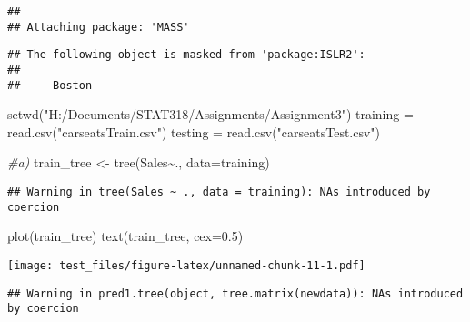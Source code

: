 \documentclass[
]{article}
\newenvironment{Shaded}{\begin{snugshade}}{\end{snugshade}}
\newcommand{\AttributeTok}[1]{\textcolor[rgb]{0.77,0.63,0.00}{#1}}
\newcommand{\CommentTok}[1]{\textcolor[rgb]{0.56,0.35,0.01}{\textit{#1}}}
\newcommand{\DecValTok}[1]{\textcolor[rgb]{0.00,0.00,0.81}{#1}}
\newcommand{\FloatTok}[1]{\textcolor[rgb]{0.00,0.00,0.81}{#1}}
\newcommand{\FunctionTok}[1]{\textcolor[rgb]{0.00,0.00,0.00}{#1}}
\newcommand{\NormalTok}[1]{#1}
\newcommand{\OtherTok}[1]{\textcolor[rgb]{0.56,0.35,0.01}{#1}}
\newcommand{\SpecialCharTok}[1]{\textcolor[rgb]{0.00,0.00,0.00}{#1}}
\newcommand{\StringTok}[1]{\textcolor[rgb]{0.31,0.60,0.02}{#1}}
\begin{document}
\begin{verbatim}
## 
## Attaching package: 'MASS'
\end{verbatim}

\begin{verbatim}
## The following object is masked from 'package:ISLR2':
## 
##     Boston
\end{verbatim}

\begin{Shaded}
\begin{Highlighting}[]
\FunctionTok{setwd}\NormalTok{(}\StringTok{"H:/Documents/STAT318/Assignments/Assignment3"}\NormalTok{)}
\NormalTok{training }\OtherTok{=} \FunctionTok{read.csv}\NormalTok{(}\StringTok{"carseatsTrain.csv"}\NormalTok{)}
\NormalTok{testing }\OtherTok{=} \FunctionTok{read.csv}\NormalTok{(}\StringTok{"carseatsTest.csv"}\NormalTok{)}

\CommentTok{\#a)}
\NormalTok{train\_tree }\OtherTok{\textless{}{-}} \FunctionTok{tree}\NormalTok{(Sales}\SpecialCharTok{\textasciitilde{}}\NormalTok{., }\AttributeTok{data=}\NormalTok{training)}
\end{Highlighting}
\end{Shaded}

\begin{verbatim}
## Warning in tree(Sales ~ ., data = training): NAs introduced by coercion
\end{verbatim}

\begin{Shaded}
\begin{Highlighting}[]
\FunctionTok{plot}\NormalTok{(train\_tree)}
\FunctionTok{text}\NormalTok{(train\_tree,}
     \AttributeTok{cex=}\FloatTok{0.5}\NormalTok{)}
\end{Highlighting}
\end{Shaded}

\texttt{[image: test\_files/figure-latex/unnamed-chunk-11-1.pdf]}

\begin{Shaded}
\end{Shaded}

\begin{verbatim}
## Warning in pred1.tree(object, tree.matrix(newdata)): NAs introduced by coercion
\end{verbatim}
\end{document}
